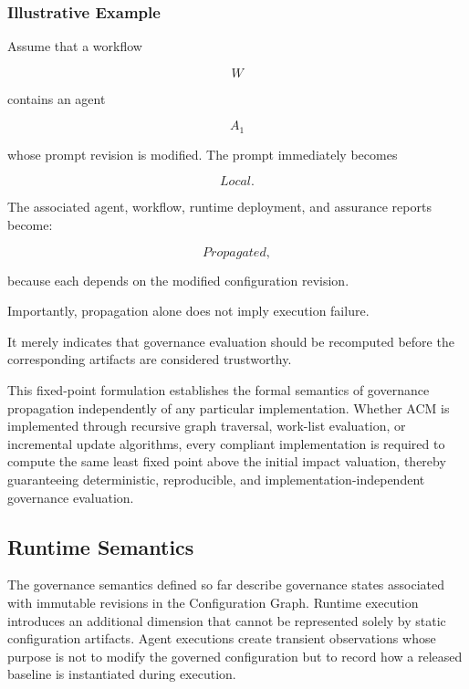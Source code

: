 \documentclass[10pt]{article}
\begin{document}
\subsubsection{Illustrative Example}

Assume that a workflow

\[
W
\]

contains an agent

\[
A_1
\]

whose prompt revision is modified. The prompt immediately becomes

\[
Local.
\]

The associated agent, workflow, runtime deployment, and assurance reports become:

\[
Propagated,
\]

because each depends on the modified configuration revision.

Importantly, propagation alone does not imply execution failure.

It merely indicates that governance evaluation should be recomputed before the corresponding artifacts are considered trustworthy.



This fixed-point formulation establishes the formal semantics of governance propagation independently of any particular implementation. Whether ACM is implemented through recursive graph traversal, work-list evaluation, or incremental update algorithms, every compliant implementation is required to compute the same least fixed point above the initial impact valuation, thereby guaranteeing deterministic,
reproducible, and implementation-independent governance evaluation.


\subsection{Runtime Semantics}
\label{subsec:runtime_semantics}

The governance semantics defined so far describe governance states associated
with immutable revisions in the Configuration Graph. Runtime execution
introduces an additional dimension that cannot be represented solely by static
configuration artifacts. Agent executions create transient observations whose
purpose is not to modify the governed configuration but to record how a released
baseline is instantiated during execution.
\end{document}
